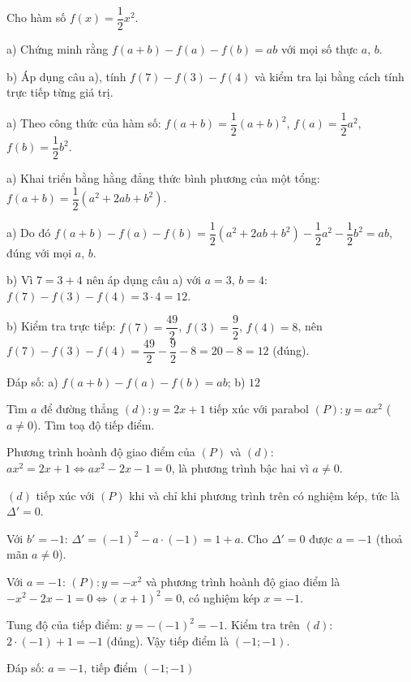 \begin{problem}[9DS-HSB2-039]
Cho hàm số $f(x) = \dfrac{1}{2}x^2$.

a) Chứng minh rằng $f(a + b) - f(a) - f(b) = ab$ với mọi số thực $a$, $b$.

b) Áp dụng câu a), tính $f(7) - f(3) - f(4)$ và kiểm tra lại bằng cách tính trực tiếp từng giá trị.

\begin{solution}
a) Theo công thức của hàm số: $f(a + b) = \dfrac{1}{2}(a + b)^2$, $f(a) = \dfrac{1}{2}a^2$, $f(b) = \dfrac{1}{2}b^2$.

a) Khai triển bằng hằng đẳng thức bình phương của một tổng: $f(a + b) = \dfrac{1}{2}\left(a^2 + 2ab + b^2\right)$.

a) Do đó $f(a + b) - f(a) - f(b) = \dfrac{1}{2}\left(a^2 + 2ab + b^2\right) - \dfrac{1}{2}a^2 - \dfrac{1}{2}b^2 = ab$, đúng với mọi $a$, $b$.

b) Vì $7 = 3 + 4$ nên áp dụng câu a) với $a = 3$, $b = 4$: $f(7) - f(3) - f(4) = 3 \cdot 4 = 12$.

b) Kiểm tra trực tiếp: $f(7) = \dfrac{49}{2}$, $f(3) = \dfrac{9}{2}$, $f(4) = 8$, nên $f(7) - f(3) - f(4) = \dfrac{49}{2} - \dfrac{9}{2} - 8 = 20 - 8 = 12$ (đúng).

Đáp số: a) $\boxed{f(a + b) - f(a) - f(b) = ab}$; b) $\boxed{12}$
\end{solution}
\end{problem}

\begin{problem}[9DS-HSB2-040]
Tìm $a$ để đường thẳng $(d)\colon y = 2x + 1$ tiếp xúc với parabol $(P)\colon y = ax^2$ ($a \neq 0$). Tìm toạ độ tiếp điểm.

\begin{solution}
Phương trình hoành độ giao điểm của $(P)$ và $(d)$: $ax^2 = 2x + 1 \Leftrightarrow ax^2 - 2x - 1 = 0$, là phương trình bậc hai vì $a \neq 0$.

$(d)$ tiếp xúc với $(P)$ khi và chỉ khi phương trình trên có nghiệm kép, tức là $\Delta' = 0$.

Với $b' = -1$: $\Delta' = (-1)^2 - a \cdot (-1) = 1 + a$. Cho $\Delta' = 0$ được $a = -1$ (thoả mãn $a \neq 0$).

Với $a = -1$: $(P)\colon y = -x^2$ và phương trình hoành độ giao điểm là $-x^2 - 2x - 1 = 0 \Leftrightarrow (x + 1)^2 = 0$, có nghiệm kép $x = -1$.

Tung độ của tiếp điểm: $y = -(-1)^2 = -1$. Kiểm tra trên $(d)$: $2 \cdot (-1) + 1 = -1$ (đúng). Vậy tiếp điểm là $(-1; -1)$.

Đáp số: $\boxed{a = -1,\ \text{tiếp điểm } (-1; -1)}$
\end{solution}
\end{problem}

